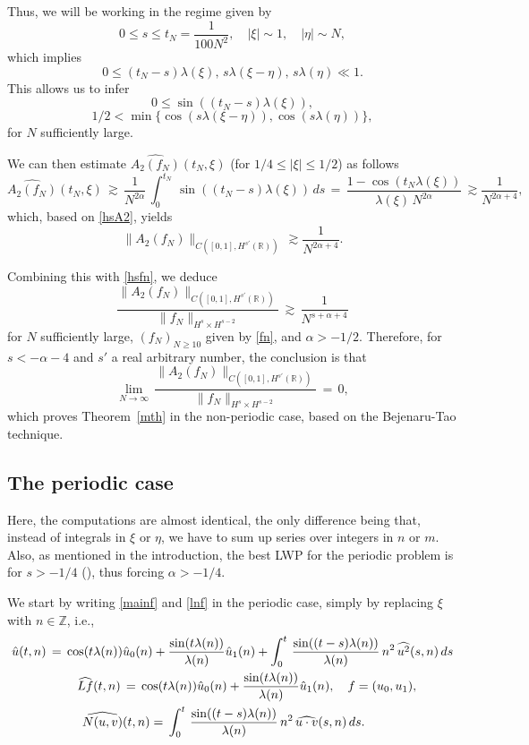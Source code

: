\documentclass{amsart}
\begin{document}
Thus, we will be working in the regime given by
\[
0\leq s\leq t_N=\frac{1}{100 N^2}, \quad |\xi|\sim 1, \quad |\eta|\sim N,\]
which implies
\[
0 \leq (t_N-s) \lambda(\xi),\,s \lambda(\xi-\eta),\, s\lambda(\eta) \ll 1. \]
This allows us to infer
\[
0 \leq \sin ((t_N-s) \lambda(\xi)),
\]
\[
1/2 < \min\{\cos(s \lambda(\xi-\eta)), \cos(s\lambda(\eta))\},
\]
for $N$ sufficiently large. 

We can then estimate $\widehat{A_2(f_N)}(t_N,\xi)$ (for $1/4\leq |\xi| \leq 1/2$) as follows
\[
\widehat{A_2(f_N)}(t_N,\xi)\,\gtrsim\,\frac{1}{N^{2\alpha}}\,\int_0^{t_N}\, \sin((t_N-s) \lambda(\xi))\,ds\,=\,\frac{1-\cos(t_N \lambda(\xi))}{\lambda(\xi)\,N^{2\alpha}}\,\gtrsim \frac{1}{N^{2\alpha+4}},\]
which, based on \eqref{hsA2}, yields
\begin{equation}
\|A_2(f_N)\|_{C([0,1], H^{s'}(\mathbb{R}))}\,\gtrsim \frac{1}{N^{2\alpha+4}}.
\end{equation}

Combining this with \eqref{hsfn}, we deduce 
\begin{equation}
\frac{\|A_2(f_N)\|_{C([0,1], H^{s'}(\mathbb{R}))}}{\|f_N\|_{H^s \times H^{s -2}}}\,\gtrsim\, \frac{1}{N^{s+\alpha+4}}
\end{equation}
for $N$ sufficiently large, $(f_N)_{N\geq 10}$ given by \eqref{fn}, and $\alpha>-1/2$. Therefore, for $s<-\alpha-4$ and $s'$ a real arbitrary number, the conclusion is that
\begin{equation}
\lim_{N\to\infty}\,\frac{\|A_2(f_N)\|_{C([0,1], H^{s'}(\mathbb{R}))}}{\|f_N\|_{H^s \times H^{s -2}}}\,=\,0,
\end{equation}
which proves Theorem~\ref{mth} in the non-periodic case, based on the Bejenaru-Tao technique.

\subsection{The periodic case} Here, the computations are almost identical, the only difference being that, instead of integrals in $\xi$ or $\eta$, we have to sum up series over integers in $n$ or $m$. Also, as mentioned in the introduction, the best LWP for the periodic problem is for $s>-1/4$ (\cite{Farah:2010ys}), thus forcing $\alpha>-1/4$. 

We start by writing \eqref{mainf} and \eqref{lnf} in the periodic case, simply by replacing $\xi$ with $n\in\mathbb{Z}$, i.e.,
\begin{equation}
\aligned
\hat{u}(t,n)\,=\,\cos(t \lambda(n))& \hat{u}_0(n)+\frac{\sin(t \lambda(n))}{\lambda(n)} \hat{u}_1(n)+\int_0^t\,\frac{\sin((t-s) \lambda(n))}{\lambda(n)}\, n^2\, \widehat{u^2}(s,n)\,ds\\
\widehat{Lf}(t,n)\,&=\,\cos(t \lambda(n)) \hat{u}_0(n)+\frac{\sin(t \lambda(n))}{\lambda(n)} \hat{u}_1(n),\quad f=(u_0,u_1),\\
\widehat{N(u,v)}&(t,n)=\,\int_0^t\,\frac{\sin((t-s) \lambda(n))}{\lambda(n)}\, n^2\, \widehat{u\cdot v}(s,n)\,ds.\endaligned
\end{equation}
\end{document}
